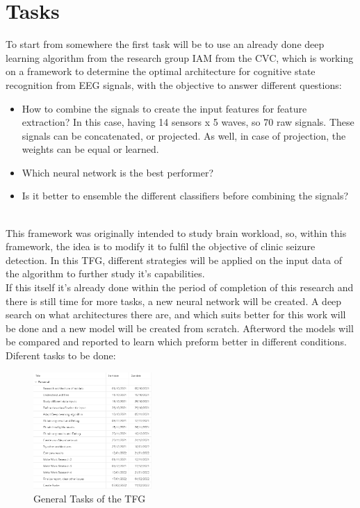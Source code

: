 ﻿\documentclass[10pt,a4paper,twocolumn,twoside]{article}
\begin{document}
\section{Tasks}
\label{sec-tasks}
To start from somewhere the first task will be to use an already done deep learning algorithm from the research group IAM from the CVC, which is working on a framework to determine the optimal architecture for cognitive state recognition from EEG signals, with the objective to answer different questions:
\begin{itemize}
  \item How to combine the signals to create the input features for feature extraction? In this case, having 14 sensors x 5 waves, so 70 raw signals. These signals can be concatenated, or projected. As well, in case of projection, the weights can be equal or learned.
  \item Which neural network is the best performer?
  \item Is it better to ensemble the different classifiers before combining the signals?
\end{itemize}
\leavevmode\\
This framework was originally intended to study brain workload, so, within this framework, the idea is to modify it to fulfil the objective of clinic seizure detection. In this TFG, different strategies will be applied on the input data of the algorithm to further study it’s capabilities.
\\
If this itself it’s already done within the period of completion of this research and there is still time for more tasks, a new neural network will be created. A deep search on what architectures there are, and which suits better for this work will be done and a new model will be created from scratch. Afterword the models will be compared and reported to learn which preform better in different conditions.
\\
Diferent tasks to be done:
\begin{figure}[!h]
  \centering
    \includegraphics[width=0.4\textwidth]{img/Tasks.png}
    \caption{General Tasks of the TFG}
    \label{fig-exemple}
  \end{figure}
\end{document}
